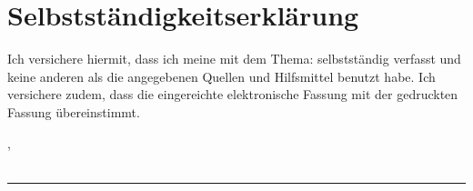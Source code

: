 \thispagestyle{empty}

\section*{Selbstständigkeitserklärung}
\vspace*{2em}


Ich versichere hiermit, dass ich meine {\myArbeit} mit dem Thema: {\itshape \myTitel } selbstständig verfasst und keine anderen als die angegebenen Quellen und Hilfsmittel benutzt habe. Ich versichere zudem, dass die eingereichte elektronische Fassung mit der gedruckten Fassung übereinstimmt.


\vspace{3em}
\noindent
\myAbgabeort, \myDatum
\\
\\
\noindent
\rule{6cm}{0.4pt}\\
\myAutor
